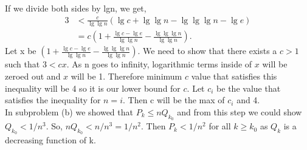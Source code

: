 \documentclass{article}
\begin{document}
If we divide both sides by lgn, we get, 
\begin{align*}
3 &< \frac{c}{\lg\lg n}(\lg c + \lg\lg n - \lg\lg\lg n - \lg e) \\
&= c(1 + \frac{\lg c - \lg e}{\lg\lg n} - \frac{\lg\lg\lg n}{\lg\lg n}).
\end{align*}
Let x be $(1 + \frac{\lg c - \lg e}{\lg\lg n} - \frac{\lg\lg\lg n}{\lg\lg n})$. We need to show that there exists a $c > 1$ such that $3 < cx$. As n goes to infinity, logarithmic terms inside of $x$ will be zeroed out and $x$ will be 1. Therefore minimum $c$ value that satisfies this inequality will be 4 so it is our lower bound for $c$. Let $c_i$ be the value that satisfies the inequality for $n = i$. Then c will be the max of $c_i$ and 4. \\
In subproblem (b) we showed that $P_k \leq nQ_{k_0}$ and from this step we could show $Q_{k_0} < 1/n^3$. So, $nQ_{k_0} < n/n^3 = 1/n^2$. Then $P_k < 1/n^2$ for all $k \geq k_0$ as $Q_k$ is a decreasing function of k.
\end{document}
